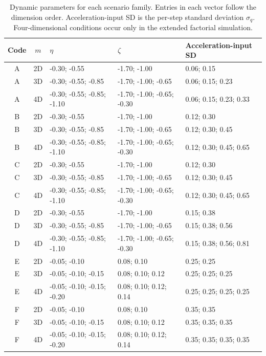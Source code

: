 \documentclass[
]{article}
\begin{document}
\begin{table}[H]

\caption{Dynamic parameters for each scenario family. Entries in each vector follow the dimension order. Acceleration-input SD is the per-step standard deviation $\sigma_q$. Four-dimensional conditions occur only in the extended factorial simulation.}
\centering
\footnotesize
{}

\begin{tabular}[t]{ccp{1.70in}p{1.70in}p{1.65in}}
\toprule
Code & $m$ & $\eta$ & $\zeta$ & Acceleration-input SD\\
\midrule
A & 2D & -0.30; -0.55 & -1.70; -1.00 & 0.06; 0.15\\
A & 3D & -0.30; -0.55; -0.85 & -1.70; -1.00; -0.65 & 0.06; 0.15; 0.23\\
A & 4D & -0.30; -0.55; -0.85; -1.10 & -1.70; -1.00; -0.65; -0.30 & 0.06; 0.15; 0.23; 0.33\\
B & 2D & -0.30; -0.55 & -1.70; -1.00 & 0.12; 0.30\\
B & 3D & -0.30; -0.55; -0.85 & -1.70; -1.00; -0.65 & 0.12; 0.30; 0.45\\
\addlinespace
B & 4D & -0.30; -0.55; -0.85; -1.10 & -1.70; -1.00; -0.65; -0.30 & 0.12; 0.30; 0.45; 0.65\\
C & 2D & -0.30; -0.55 & -1.70; -1.00 & 0.12; 0.30\\
C & 3D & -0.30; -0.55; -0.85 & -1.70; -1.00; -0.65 & 0.12; 0.30; 0.45\\
C & 4D & -0.30; -0.55; -0.85; -1.10 & -1.70; -1.00; -0.65; -0.30 & 0.12; 0.30; 0.45; 0.65\\
D & 2D & -0.30; -0.55 & -1.70; -1.00 & 0.15; 0.38\\
\addlinespace
D & 3D & -0.30; -0.55; -0.85 & -1.70; -1.00; -0.65 & 0.15; 0.38; 0.56\\
D & 4D & -0.30; -0.55; -0.85; -1.10 & -1.70; -1.00; -0.65; -0.30 & 0.15; 0.38; 0.56; 0.81\\
E & 2D & -0.05; -0.10 & 0.08; 0.10 & 0.25; 0.25\\
E & 3D & -0.05; -0.10; -0.15 & 0.08; 0.10; 0.12 & 0.25; 0.25; 0.25\\
E & 4D & -0.05; -0.10; -0.15; -0.20 & 0.08; 0.10; 0.12; 0.14 & 0.25; 0.25; 0.25; 0.25\\
\addlinespace
F & 2D & -0.05; -0.10 & 0.08; 0.10 & 0.35; 0.35\\
F & 3D & -0.05; -0.10; -0.15 & 0.08; 0.10; 0.12 & 0.35; 0.35; 0.35\\
F & 4D & -0.05; -0.10; -0.15; -0.20 & 0.08; 0.10; 0.12; 0.14 & 0.35; 0.35; 0.35; 0.35\\
\bottomrule
\end{tabular}
\end{table}\endgroup
\end{document}
